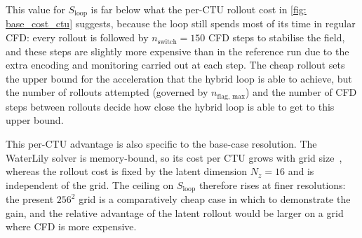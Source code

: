 This value for $S_\text{loop}$ is far below what the per-CTU rollout cost in \autoref{fig: base_cost_ctu} suggests, because the loop still spends most of its time in regular CFD: every rollout is followed by $n_\text{switch} = 150$ CFD steps to stabilise the field, and these steps are slightly more expensive than in the reference run due to the extra encoding and monitoring carried out at each step. The cheap rollout sets the upper bound for the acceleration that the hybrid loop is able to achieve, but the number of rollouts attempted (governed by $n_\text{flag, max}$) and the number of CFD steps between rollouts decide how close the hybrid loop is able to get to this upper bound.

This per-CTU advantage is also specific to the base-case resolution. The WaterLily solver is memory-bound, so its cost per CTU grows with grid size~\cite{Weymouth2025}, whereas the rollout cost is fixed by the latent dimension $N_z = 16$ and is independent of the grid. The ceiling on $S_\text{loop}$ therefore rises at finer resolutions: the present $256^2$ grid is a comparatively cheap case in which to demonstrate the gain, and the relative advantage of the latent rollout would be larger on a grid where CFD is more expensive.


